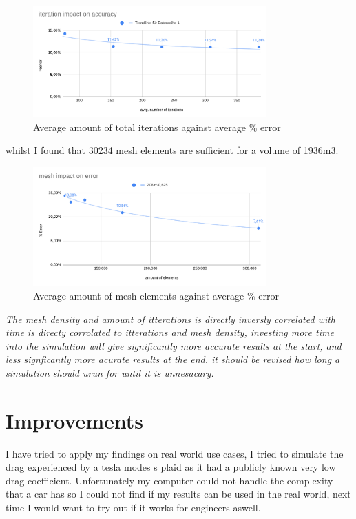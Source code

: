 \documentclass[12pt,a4paper]{article}
\begin{document}
\begin{figure}[H]
\centering
\includegraphics[width=0.8\textwidth]{image11.png}
\caption{Average amount of total iterations against average \% error}
\label{fig:iterations_final}
\end{figure}

whilst I found that 30234 mesh elements are sufficient for a volume of 1936m3.

\begin{figure}[H]
\centering
\includegraphics[width=0.8\textwidth]{image2.png}
\caption{Average amount of mesh elements against average \% error}
\label{fig:mesh_final}
\end{figure}\textit{
The mesh density and amount of itterations is directly inversly correlated with %
time is directy corrolated to itterations and mesh density, 
investing more time into the simulation will give significantly more accurate results at the start, and less signficantly more acurate results at the end.
it should be revised how long a simulation should urun for until it is unnesacary.}


\section{Improvements}

I have tried to apply my findings on real world use cases, I tried to simulate the drag experienced by a tesla modes s plaid as it had a publicly known very low drag coefficient. Unfortunately my computer could not handle the complexity that a car has so I could not find if my results can be used in the real world, next time I would want to try out if it works for engineers aswell. 
\end{document}
